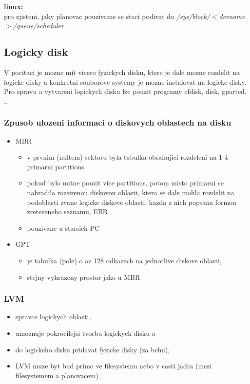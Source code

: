 \documentclass[a4paper, 11pt]{article}
\begin{document}
\noindent\textbf{linux:} \\ [0.5em]
pro zjisteni, jaky planovac pouzivame se staci podivat do \textit{/sys/block/$<$devname$>$/queue/scheduler} \\

\subsection{Logicky disk} \label{5.11}
V pocitaci je mozne mit vicero fyzickych disku, ktere je dale mozne rozdelit na logicke disky a konkretni souborove systemy je mozne instalovat na logicke disky. Pro spravu a vytvareni logickych disku lze pouzit programy cfdisk, disk, gparted, .. \\

\subsubsection{Zpusob ulozeni informaci o diskovych oblastech na disku}
\begin{itemize}
    \item MBR
    \begin{itemize}
        \item v prvnim (nultem) sektoru byla tabulka obsahujici rozdeleni na 1-4 primarni partitions
        \item pokud bylo nutne pouzit vice partitions, potom misto primarni se nahradila rozsirenou diskovou oblasti, ktera se dale mohla rozdelit na podoblasti zvane logicke diskove oblasti, kazda z nich popsana formou zretezeneho seznamu, EBR
        \item pouzivane u starsich PC
    \end{itemize}
    \item GPT
    \begin{itemize}
        \item je tabulka (pole) o az 128 odkazech na jednotlive diskove oblasti,
        \item stejny vyhrazeny prostor jako u MBR \\
    \end{itemize}
\end{itemize}

\subsubsection{LVM}
\begin{itemize}
    \item spravce logickych oblasti,
    \item umoznuje pokrocilejsi tvorbu logickych disku a
    \item do logickeho disku pridavat fyzicke disky (za behu),
    \item LVM muze byt bud primo ve filesystemu nebo v casti jadra (mezi filesystemem a planovacem). \\
\end{itemize}
\end{document}
